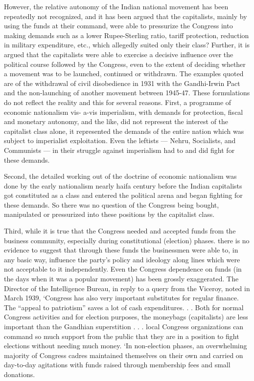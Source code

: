 However, the relative autonomy of the Indian national movement has been repeatedly not recognized, and it has been argued that the capitalists, mainly by using the funds at their command, were able to pressurize the Congress into making demands such as a lower Rupee-Sterling ratio, tariff protection, reduction in military expenditure, etc., which allegedly suited only their class? Further, it is argued that the capitalists were able to exercise a decisive influence over the political course followed by the Congress, even to the extent of deciding whether a movement was to be launched, continued or withdrawn. The examples quoted are of the withdrawal of civil disobedience in 1931 with the Gandhi-Irwin Pact and the non-launching of another movement between 1945-47. These formulations do not reflect the reality and this for several reasons. First, a programme of economic nationalism vis- a-vis imperialism, with demands for protection, fiscal and monetary autonomy, and the like, did not represent the interest of the capitalist class alone, it represented the demands of the entire nation which was subject to imperialist exploitation. Even the leftists — Nehru, Socialists, and Communists — in their struggle against imperialism had to and did fight for these demands. 

Second, the detailed working out of the doctrine of economic nationalism was done by the early nationalism nearly haifa century before the Indian capitalists got constituted as a class and entered the political arena and began fighting for these demands. So there was no question of the Congress being bought, manipulated or pressurized into these positions by the capitalist class. 

Third, while it is true that the Congress needed and accepted funds from the business community, especially during constitutional (election) phases. there is no evidence to suggest that through these funds the businessmen were able to, in any basic way, influence the party’s policy and ideology along lines which were not acceptable to it independently. Even the Congress dependence on funds (in the days when it was a popular movement) has been grossly exaggerated. The Director of the Intelligence Bureau, in reply to a query from the Viceroy, noted in March 1939, ‘Congress has also very important substitutes for regular finance. The “appeal to patriotism” saves a lot of cash expenditures. . . Both for normal Congress activities and for election purposes, the moneybags (capitalists) are less important than the Gandhian superstition . . . local Congress organizations can command so much support from the public that they are in a position to fight elections without needing much money. ‘In non-election phases, an overwhelming majority of Congress cadres maintained themselves on their own and carried on day-to-day agitations with funds raised through membership fees and small donations. 

